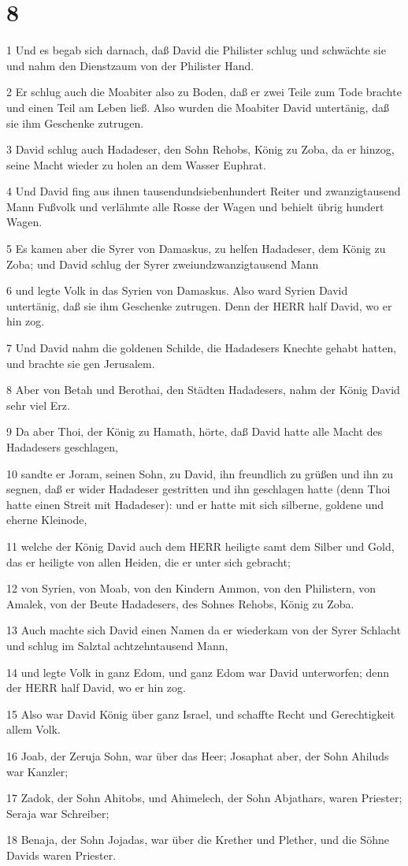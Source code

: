 \chapter{8}

\par 1 Und es begab sich darnach, daß David die Philister schlug und schwächte sie und nahm den Dienstzaum von der Philister Hand.
\par 2 Er schlug auch die Moabiter also zu Boden, daß er zwei Teile zum Tode brachte und einen Teil am Leben ließ. Also wurden die Moabiter David untertänig, daß sie ihm Geschenke zutrugen.
\par 3 David schlug auch Hadadeser, den Sohn Rehobs, König zu Zoba, da er hinzog, seine Macht wieder zu holen an dem Wasser Euphrat.
\par 4 Und David fing aus ihnen tausendundsiebenhundert Reiter und zwanzigtausend Mann Fußvolk und verlähmte alle Rosse der Wagen und behielt übrig hundert Wagen.
\par 5 Es kamen aber die Syrer von Damaskus, zu helfen Hadadeser, dem König zu Zoba; und David schlug der Syrer zweiundzwanzigtausend Mann
\par 6 und legte Volk in das Syrien von Damaskus. Also ward Syrien David untertänig, daß sie ihm Geschenke zutrugen. Denn der HERR half David, wo er hin zog.
\par 7 Und David nahm die goldenen Schilde, die Hadadesers Knechte gehabt hatten, und brachte sie gen Jerusalem.
\par 8 Aber von Betah und Berothai, den Städten Hadadesers, nahm der König David sehr viel Erz.
\par 9 Da aber Thoi, der König zu Hamath, hörte, daß David hatte alle Macht des Hadadesers geschlagen,
\par 10 sandte er Joram, seinen Sohn, zu David, ihn freundlich zu grüßen und ihn zu segnen, daß er wider Hadadeser gestritten und ihn geschlagen hatte (denn Thoi hatte einen Streit mit Hadadeser): und er hatte mit sich silberne, goldene und eherne Kleinode,
\par 11 welche der König David auch dem HERR heiligte samt dem Silber und Gold, das er heiligte von allen Heiden, die er unter sich gebracht;
\par 12 von Syrien, von Moab, von den Kindern Ammon, von den Philistern, von Amalek, von der Beute Hadadesers, des Sohnes Rehobs, König zu Zoba.
\par 13 Auch machte sich David einen Namen da er wiederkam von der Syrer Schlacht und schlug im Salztal achtzehntausend Mann,
\par 14 und legte Volk in ganz Edom, und ganz Edom war David unterworfen; denn der HERR half David, wo er hin zog.
\par 15 Also war David König über ganz Israel, und schaffte Recht und Gerechtigkeit allem Volk.
\par 16 Joab, der Zeruja Sohn, war über das Heer; Josaphat aber, der Sohn Ahiluds war Kanzler;
\par 17 Zadok, der Sohn Ahitobs, und Ahimelech, der Sohn Abjathars, waren Priester; Seraja war Schreiber;
\par 18 Benaja, der Sohn Jojadas, war über die Krether und Plether, und die Söhne Davids waren Priester.

